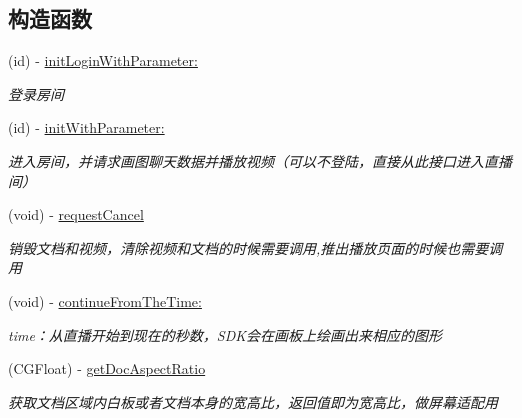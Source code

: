 \subsection*{构造函数}
\begin{DoxyCompactItemize}
\item 
(id) -\/ \hyperlink{interface_request_data_play_back_a7684c4a40fb878031fdfb0eff0633316}{init\+Login\+With\+Parameter\+:}
\begin{DoxyCompactList}\small\item\em 登录房间 \end{DoxyCompactList}\item 
(id) -\/ \hyperlink{interface_request_data_play_back_a776ab7183abc45c9ca6c195e1717f29f}{init\+With\+Parameter\+:}
\begin{DoxyCompactList}\small\item\em 进入房间，并请求画图聊天数据并播放视频（可以不登陆，直接从此接口进入直播间） \end{DoxyCompactList}\item 
\mbox{\label{interface_request_data_play_back_af780ab6c671e6e4392c40460b1e9312f}} 
(void) -\/ \hyperlink{interface_request_data_play_back_af780ab6c671e6e4392c40460b1e9312f}{request\+Cancel}
\begin{DoxyCompactList}\small\item\em 销毁文档和视频，清除视频和文档的时候需要调用,推出播放页面的时候也需要调用 \end{DoxyCompactList}\item 
\mbox{\label{interface_request_data_play_back_aee56b80b39cc622c9621f6c51b8c4ecc}} 
(void) -\/ \hyperlink{interface_request_data_play_back_aee56b80b39cc622c9621f6c51b8c4ecc}{continue\+From\+The\+Time\+:}
\begin{DoxyCompactList}\small\item\em time：从直播开始到现在的秒数，\+S\+D\+K会在画板上绘画出来相应的图形 \end{DoxyCompactList}\item 
\mbox{\label{interface_request_data_play_back_ad7e16084e7da421a84e1a45a9cb10fb5}} 
(C\+G\+Float) -\/ \hyperlink{interface_request_data_play_back_ad7e16084e7da421a84e1a45a9cb10fb5}{get\+Doc\+Aspect\+Ratio}
\begin{DoxyCompactList}\small\item\em 获取文档区域内白板或者文档本身的宽高比，返回值即为宽高比，做屏幕适配用 \end{DoxyCompactList}\item 

\end{DoxyCompactItemize}
